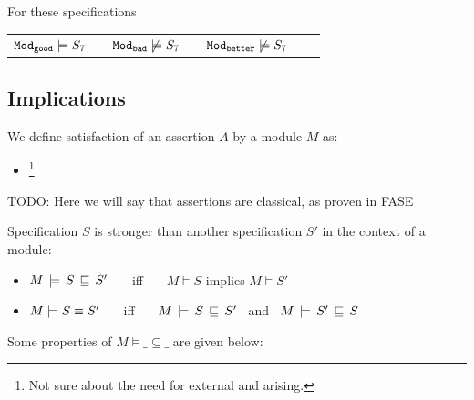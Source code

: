 { \noindent
 For  these specifications
 
 \begin{tabular}{lllllll}
${\texttt{Mod}}_{{\texttt{good}}}  \models S_7$  & & ${\texttt{Mod}}_{{\texttt{bad}}} \not\models S_7$ &&  ${\texttt{Mod}}_{{\texttt{better}}} \not\models S_7$ \\
\end{tabular}

\subsection{\SpecLang Implications}

\begin{definition} 
\label{def:assertion-inference-semantics}
We define satisfaction of an assertion $A$ by a  module $M$ as:
\begin{itemize}
\item
{}\footnote{Not sure about the need for external and arising.}
\end{itemize}
\end{definition}

TODO: Here we will say that assertions are classical, as proven in FASE

\begin{definition} 
\label{def:specification-implication-semantics}
Specification $S$ is stronger than another specification $S'$  in the context of a  module: 
 \begin{itemize}[itemsep=5pt]
\item 
$M\, \models\, S\, \sqsubseteq\, S'$   \ \ \ iff \ \ \  $M\models S$ implies $M \models S'$
\item
$M \models S  \equiv  S'$   \ \ \ iff \ \ \ $M\, \models\, S\, \sqsubseteq\, S'$  \ and \  $M\, \models\, S'\, \sqsubseteq\, S$    
\end{itemize}
\end{definition}

Some properties of $M \models \_  \subseteq \_ $ are given below:

}
